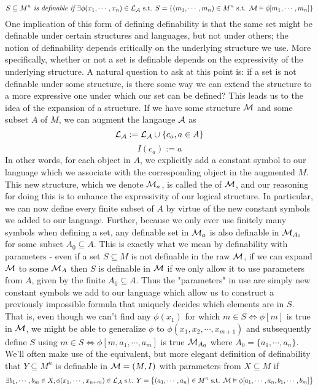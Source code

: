 \documentclass{article}
\begin{document}
    $$ S \subseteq M^n \textit{ is definable if } \exists \phi(x_1, \cdots, x_n) \in \mathcal{L}_{\mathcal{A}} \textnormal{ s.t. } S = \{ (m_1, \cdots, m_n) \in M^n \textnormal{ s.t. } \mathcal{M} \vDash \phi[m_1, \cdots, m_n] \} $$
One implication of this form of defining definability is that the same set might be definable under certain structures and languages, but not under others; the notion of definability depends critically on the underlying structure we use. More specifically, whether or not a set is definable depends on the expressivity of the underlying structure. A natural question to ask at this point is: if a set is not definable under some structure, is there some way we can extend the structure to a more expressive one under which our set can be defined? This leads us to the idea of the expansion of a structure. If we have some structure $ \mathcal{M} $ and some subset $ A $ of $ M $, we can augment the langauge $ \mathcal{A} $ as
    $$ \mathcal{L}_{\mathcal{A}} := \mathcal{L}_{\mathcal{A}} \cup \{ c_a, a \in A \} $$
    $$ I(c_a) := a $$
In other words, for each object in $ A $, we explicitly add a constant symbol to our language which we associate with the corresponding object in the augmented $ M $. This new structure, which we denote $ \mathcal{M}_a $, is called the  of $ \mathcal{M} $, and our reasoning for doing this is to enhance the expressivity of our logical structure. In particular, we can now define every finite subset of $ A $ by virtue of the new constant symbols we added to our language. Further, because we only ever use finitely many symbols when defining a set, any definable set in $ \mathcal{M}_a $ is also definable in $ \mathcal{M}_{A_0} $ for some subset $ A_0 \subseteq A $. This is exactly what we mean by definability with parameters - even if a set $ S \subseteq M $ is not definable in the raw $ \mathcal{M} $, if we can expand $ \mathcal{M} $ to some $ \mathcal{M}_A $ then $ S $ is definable in $ \mathcal{M} $ if we only allow it to use parameters from $ A $, given by the finite $ A_0 \subseteq A $. Thus the "parameters" in use are simply new constant symbols we add to our language which allow us to construct a previously impossible formula that uniquely decides which elements are in $ S $. That is, even though we can't find any $ \phi(x_1) $ for which $ m \in S \iff \phi[m] $ is true in $ \mathcal{M} $, we might be able to generalize $ \phi $ to $ \phi(x_1, x_2, \cdots, x_{m + 1}) $ and subsequently define $ S $ using $ m \in S \iff \phi[m, a_1, \cdots, a_m] $ is true $ \mathcal{M}_{A_0} $ where $ A_0 = \{ a_1, \cdots, a_n \} $.
\nn
We'll often make use of the equivalent, but more elegant definition of definability that $ Y \subseteq M^n $ is definable in $ \mathcal{M} = (M, I) $ with parameters from $ X \subseteq M $ if
    $$ \exists b_1, \cdots, b_m \in X, \phi(x_1, \cdots, x_{n + m}) \in \mathcal{L}_{\mathcal{A}} \textnormal{ s.t. } Y = \big \{ (a_1, \cdots, a_n) \in M^n \textnormal{ s.t. } \mathcal{M} \vDash \phi[a_1, \cdots, a_n, b_1, \cdots, b_m] \big \} $$
\end{document}
